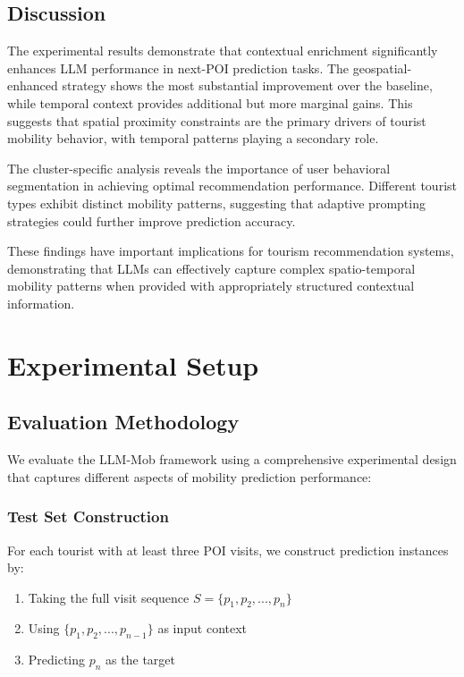 \documentclass[12pt,a4paper]{article}
\begin{document}
\subsection{Discussion}

The experimental results demonstrate that contextual enrichment significantly enhances LLM performance in next-POI prediction tasks. The geospatial-enhanced strategy shows the most substantial improvement over the baseline, while temporal context provides additional but more marginal gains. This suggests that spatial proximity constraints are the primary drivers of tourist mobility behavior, with temporal patterns playing a secondary role.

The cluster-specific analysis reveals the importance of user behavioral segmentation in achieving optimal recommendation performance. Different tourist types exhibit distinct mobility patterns, suggesting that adaptive prompting strategies could further improve prediction accuracy.

These findings have important implications for tourism recommendation systems, demonstrating that LLMs can effectively capture complex spatio-temporal mobility patterns when provided with appropriately structured contextual information.

\section{Experimental Setup}

\subsection{Evaluation Methodology}

We evaluate the LLM-Mob framework using a comprehensive experimental design that captures different aspects of mobility prediction performance:

\subsubsection{Test Set Construction}
For each tourist with at least three POI visits, we construct prediction instances by:
\begin{enumerate}
\item Taking the full visit sequence $S = \{p_1, p_2, ..., p_n\}$
\item Using $\{p_1, p_2, ..., p_{n-1}\}$ as input context
\item Predicting $p_n$ as the target
\end{enumerate}
\end{document}

